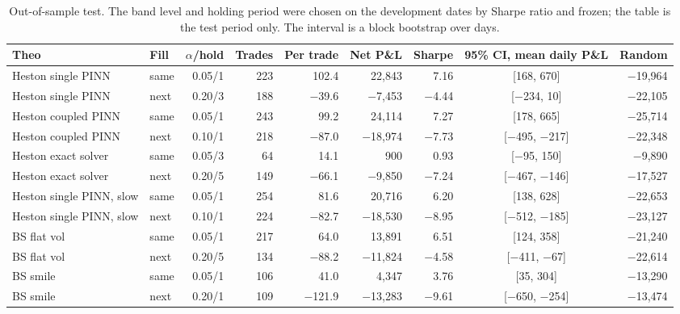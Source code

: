 \begin{table}[t]
\centering
\small
\caption{Out-of-sample test. The band level and holding period were chosen on the development dates by Sharpe ratio and frozen; the table is the test period only. The interval is a block bootstrap over days.}
\label{tab:oos}
\begin{tabular}{llrrrrrcr}
\toprule
Theo & Fill & $\alpha$/hold & Trades & Per trade & Net P\&L & Sharpe & 95\% CI, mean daily P\&L & Random \\
\midrule
Heston single PINN & same & 0.05/1 & 223 & 102.4 & 22,843 & 7.16 & [168, 670] & $-$19,964 \\
Heston single PINN & next & 0.20/3 & 188 & $-$39.6 & $-$7,453 & $-$4.44 & [$-$234, 10] & $-$22,105 \\
Heston coupled PINN & same & 0.05/1 & 243 & 99.2 & 24,114 & 7.27 & [178, 665] & $-$25,714 \\
Heston coupled PINN & next & 0.10/1 & 218 & $-$87.0 & $-$18,974 & $-$7.73 & [$-$495, $-$217] & $-$22,348 \\
Heston exact solver & same & 0.05/3 & 64 & 14.1 & 900 & 0.93 & [$-$95, 150] & $-$9,890 \\
Heston exact solver & next & 0.20/5 & 149 & $-$66.1 & $-$9,850 & $-$7.24 & [$-$467, $-$146] & $-$17,527 \\
Heston single PINN, slow & same & 0.05/1 & 254 & 81.6 & 20,716 & 6.20 & [138, 628] & $-$22,653 \\
Heston single PINN, slow & next & 0.10/1 & 224 & $-$82.7 & $-$18,530 & $-$8.95 & [$-$512, $-$185] & $-$23,127 \\
BS flat vol & same & 0.05/1 & 217 & 64.0 & 13,891 & 6.51 & [124, 358] & $-$21,240 \\
BS flat vol & next & 0.20/5 & 134 & $-$88.2 & $-$11,824 & $-$4.58 & [$-$411, $-$67] & $-$22,614 \\
BS smile & same & 0.05/1 & 106 & 41.0 & 4,347 & 3.76 & [35, 304] & $-$13,290 \\
BS smile & next & 0.20/1 & 109 & $-$121.9 & $-$13,283 & $-$9.61 & [$-$650, $-$254] & $-$13,474 \\
\bottomrule
\end{tabular}
\end{table}
